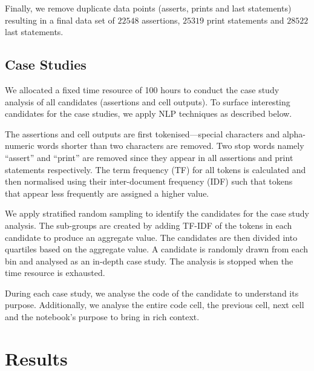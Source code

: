 Finally, we remove duplicate data points (asserts, prints and last statements) resulting in a final data set of $22548$ assertions, $25319$ print statements and $28522$ last statements.

\subsection{Case Studies}


We allocated a fixed time resource of 100 hours to conduct the case study analysis of all candidates (assertions and cell outputs). To surface interesting candidates for the case studies, we apply NLP techniques as described below.


The assertions and cell outputs are first tokenised---special characters and alpha-numeric words shorter than two characters are removed. Two stop words namely ``assert'' and ``print'' are removed since they appear in all assertions and print statements respectively. The term frequency (TF) for all tokens is calculated and then normalised using their inter-document frequency (IDF) such that tokens that appear less frequently are assigned a higher value.

We apply stratified random sampling to identify the candidates for the case study analysis. The sub-groups are created by adding TF-IDF of the tokens in each candidate to produce an aggregate value. The candidates are then divided into quartiles based on the aggregate value. A candidate is randomly drawn from each bin and analysed as an in-depth case study. The analysis is stopped when the time resource is exhausted.

During each case study, we analyse the code of the candidate to understand its purpose. Additionally, we analyse the entire code cell, the previous cell, next cell and the notebook's purpose to bring in rich context.

\section{Results}


